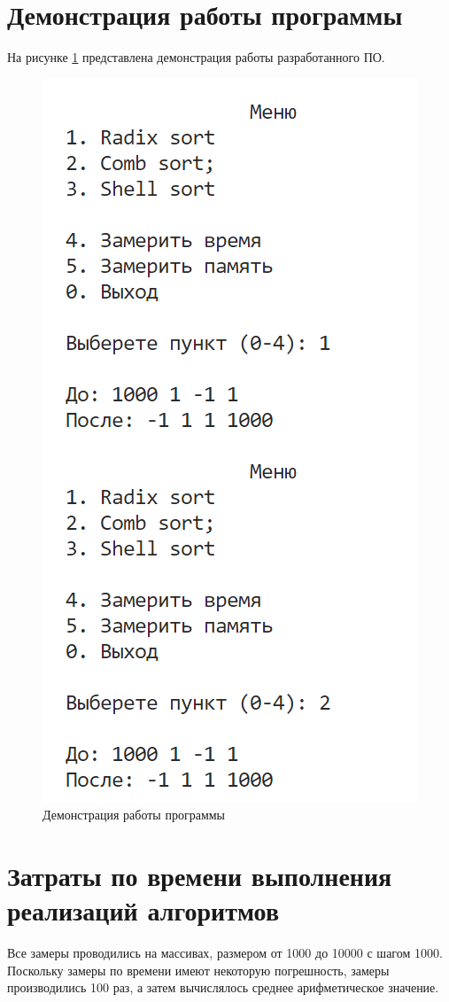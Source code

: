 \section{Демонстрация работы программы}
На рисунке \ref{img:demonstration} представлена демонстрация работы разработанного ПО.  
\begin{figure}[h]
	\centering
	\includegraphics[height=0.3\textheight]{img/prog_work.png}
	\caption{Демонстрация работы программы}
	\label{img:demonstration}
\end{figure}

\section{Затраты по времени выполнения реализаций алгоритмов}
Все замеры проводились на массивах, размером от 1000 до 10000 с шагом 1000. 
Поскольку замеры по времени имеют некоторую погрешность, замеры производились 100 раз, а затем вычислялось среднее арифметическое значение.

